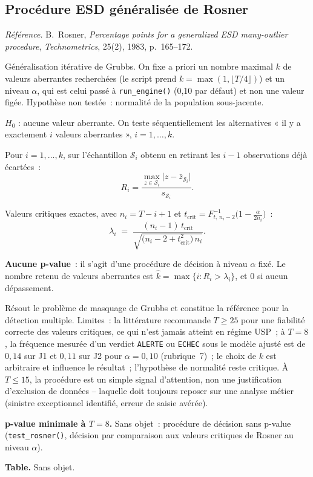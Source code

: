 \documentclass[a4paper,11pt]{article}
\newcommand{\code}[1]{\texttt{\small #1}}
\newcommand{\refl}[1]{{\small\textcolor{maincolor!70!black}{\textit{Référence.} #1}}\par\smallskip}
\newcounter{ficheid}
\newenvironment{fiche}[1]{%
  \stepcounter{ficheid}%
  \phantomsection
  \subsection{#1}%
  \label{fiche:\theficheid}%
}{%
  \end{description}\vspace{0.5em}%
}
\newcommand{\Cadre}{%
  \begin{description}[leftmargin=0pt, style=unboxed, itemsep=3pt, topsep=3pt, parsep=2pt]%
  \item[\textcolor{financeblue}{\textbf{1. Cadre, notations et hypothèses de validité (non testées).}}]}
\newcommand{\Hzero}{\item[\textcolor{financeblue}{\textbf{2. Hypothèse nulle.}}]}
\newcommand{\Stat}{\item[\textcolor{financeblue}{\textbf{3. Statistique de test.}}]}
\newcommand{\Loi}{\item[\textcolor{financeblue}{\textbf{4. Loi sous $H_0$.}}]}
\newcommand{\Pval}{\item[\textcolor{financeblue}{\textbf{5. p-value.}}]}
\newcommand{\Usage}{\item[\textcolor{financeblue}{\textbf{6. Usage et limites.}}]}
\newcommand{\Pertinence}{\item[\textcolor{financeblue}{\textbf{7. Pertinence et puissance à faible $T$.}}]}
\begin{document}
\begin{fiche}{Procédure ESD généralisée de Rosner}
\label{fiche:rosner-esd}%
\refl{B.~Rosner, \emph{Percentage points for a generalized ESD many-outlier procedure},
\emph{Technometrics}, 25(2), 1983, p.~165--172.}
\Cadre
Généralisation itérative de Grubbs. On fixe a priori un nombre maximal $k$ de valeurs aberrantes
recherchées (le script prend $k = \max(1, \lfloor T/4 \rfloor)$) et un niveau $\alpha$, qui est
celui passé à \code{run\_engine()} (0,10 par défaut) et non une valeur figée. Hypothèse non
testée~: normalité de la population sous-jacente.
\Hzero
$H_0$ : aucune valeur aberrante. On teste séquentiellement les alternatives « il y a exactement
$i$ valeurs aberrantes », $i=1,\dots,k$.
\Stat
Pour $i = 1,\dots,k$, sur l'échantillon $\mathcal{S}_i$ obtenu en retirant les $i-1$ observations
déjà écartées~:
\[
  R_i = \frac{\max_{z\in\mathcal{S}_i}\big|z - \bar z_{\mathcal{S}_i}\big|}{s_{\mathcal{S}_i}} .
\]
\Loi
Valeurs critiques exactes, avec $n_i = T-i+1$ et
$t_{\text{crit}} = F^{-1}_{t,\,n_i-2}\big(1 - \tfrac{\alpha}{2 n_i}\big)$~:
\[
  \lambda_i \;=\; \frac{(n_i - 1)\, t_{\text{crit}}}{\sqrt{\big(n_i - 2 + t_{\text{crit}}^2\big)\, n_i}} .
\]
\Pval
\textbf{Aucune p-value}~: il s'agit d'une procédure de décision à niveau $\alpha$ fixé. Le nombre
retenu de valeurs aberrantes est $\hat k = \max\{i : R_i > \lambda_i\}$, et $0$ si aucun
dépassement.
\Usage
Résout le problème de masquage de Grubbs et constitue la référence pour la détection multiple.
Limites~: la littérature recommande $T \ge 25$ pour une fiabilité correcte des valeurs critiques,
ce qui n'est jamais atteint en régime USP~; à $T = 8$, la fréquence mesurée d'un verdict
\code{ALERTE} ou \code{ECHEC} sous le modèle ajusté est de $0{,}14$ sur J1 et $0{,}11$ sur J2
pour $\alpha = 0{,}10$ (rubrique~7)~; le choix de $k$ est arbitraire et influence le
résultat~; l'hypothèse de normalité reste critique. À $T \le 15$, la procédure est un simple
signal d'attention, non une justification d'exclusion de données -- laquelle doit toujours reposer
sur une analyse métier (sinistre exceptionnel identifié, erreur de saisie avérée).
\Pertinence
\textbf{p-value minimale à $T = 8$.} Sans objet~: procédure de décision sans p-value (\code{test\_rosner()}, décision par comparaison aux valeurs critiques de Rosner au niveau $\alpha$).

\textbf{Table.} Sans objet.


\end{fiche}
\end{document}
